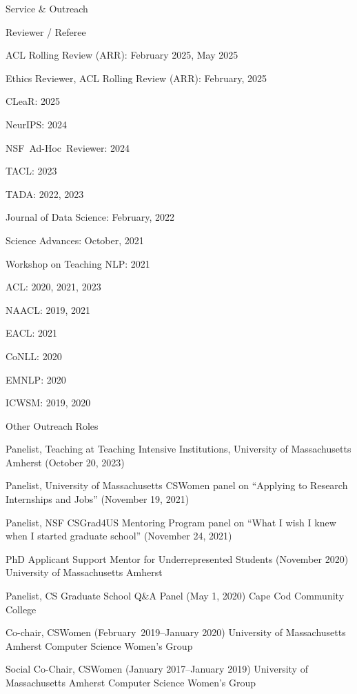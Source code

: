 \documentclass{resume} %
\begin{document}
\begin{rSection}{Service \& Outreach}
\noindent
\begin{rSubsection}{Reviewer / Referee}{}{}{}
\item ACL Rolling Review (ARR): February 2025, May 2025
\item Ethics Reviewer, ACL Rolling Review (ARR): February, 2025
\item CLeaR: 2025
\item NeurIPS: 2024
\item NSF~Ad-Hoc~Reviewer: 2024
\item TACL: 2023
\item TADA: 2022, 2023
\item Journal of Data Science: February, 2022
\item Science Advances: October, 2021
\item Workshop on Teaching NLP: 2021
\item ACL: 2020, 2021, 2023
\item NAACL: 2019, 2021
\item EACL: 2021 
\item CoNLL: 2020 
\item EMNLP: 2020 
\item ICWSM: 2019, 2020
\end{rSubsection}

\begin{rSubsection}{Other Outreach Roles}{}{}{}
\item Panelist, Teaching at Teaching Intensive Institutions, University of Massachusetts Amherst (October 20, 2023)
\item Panelist, University of Massachusetts CSWomen panel on ``Applying to Research Internships and Jobs'' (November 19, 2021)
\item Panelist, NSF CSGrad4US Mentoring Program panel on ``What I wish I knew when I started graduate school'' (November 24, 2021)
\item 
{PhD Applicant Support Mentor for Underrepresented Students} ({November 2020}) {University of Massachusetts Amherst}
\item 
{Panelist, CS Graduate School Q\&A Panel} ({May 1, 2020}) {Cape Cod Community College}

\item 
{Co-chair, CSWomen} ({February~2019--January 2020}) {University of Massachusetts Amherst Computer Science Women's Group}

\item 
{Social Co-Chair,  CSWomen} ({January 2017--January 2019}) 
{University of Massachusetts Amherst Computer Science Women's Group}


\end{rSubsection}
\end{rSection}
\end{document}

